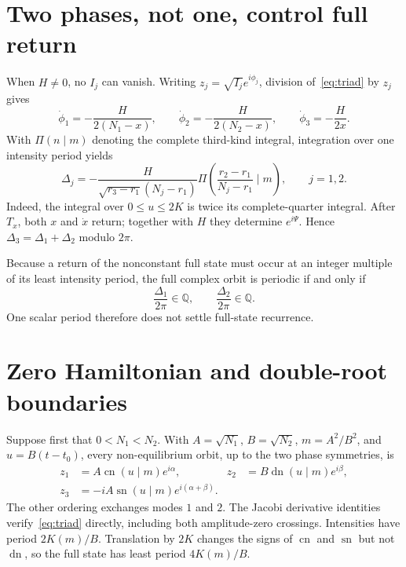 \documentclass[10pt]{article}
\newcommand{\sn}{\operatorname{sn}}
\newcommand{\cn}{\operatorname{cn}}
\newcommand{\dn}{\operatorname{dn}}
\newcommand{\PiK}{\Pi}
\begin{document}
\section{Two phases, not one, control full return}
When $H\ne0$, no $I_j$ can vanish.  Writing
$z_j=\sqrt{I_j}e^{i\phi_j}$, division of~\eqref{eq:triad} by $z_j$ gives
\begin{equation}\label{eq:phasedot}
 \dot\phi_1=-\frac{H}{2(N_1-x)},\qquad
 \dot\phi_2=-\frac{H}{2(N_2-x)},\qquad
 \dot\phi_3=-\frac{H}{2x}.
\end{equation}
With $\PiK(n\mid m)$ denoting the complete third-kind integral, integration
over one intensity period yields
\begin{equation}\label{eq:deltas}
 \Delta_j=-\frac{H}{\sqrt{r_3-r_1}(N_j-r_1)}
 \PiK\left(\frac{r_2-r_1}{N_j-r_1}\mathrel|m\right),
 \qquad j=1,2.
\end{equation}
Indeed, the integral over $0\le u\le2K$ is twice its complete-quarter
integral.  After $T_x$, both $x$ and $\dot x$ return; together with $H$
they determine $e^{i\Psi}$.  Hence
$\Delta_3=\Delta_1+\Delta_2$ modulo $2\pi$.

Because a return of the nonconstant full state must occur at an integer
multiple of its least intensity period, the full complex orbit is periodic
if and only if
\begin{equation}\label{eq:closure}
 \frac{\Delta_1}{2\pi}\in\mathbb Q,\qquad
 \frac{\Delta_2}{2\pi}\in\mathbb Q.
\end{equation}
One scalar period therefore does not settle full-state recurrence.

\section{Zero Hamiltonian and double-root boundaries}
Suppose first that $0<N_1<N_2$.  With $A=\sqrt{N_1}$,
$B=\sqrt{N_2}$, $m=A^2/B^2$, and $u=B(t-t_0)$, every non-equilibrium
orbit, up to the two phase symmetries, is
\begin{equation}\label{eq:Hzero}
 \begin{aligned}
 z_1&=A\cn(u\mid m)e^{i\alpha},&
 z_2&=B\dn(u\mid m)e^{i\beta},\\
 z_3&=-iA\sn(u\mid m)e^{i(\alpha+\beta)}.
 \end{aligned}
\end{equation}
The other ordering exchanges modes $1$ and $2$.  The Jacobi derivative
identities verify~\eqref{eq:triad} directly, including both amplitude-zero
crossings.  Intensities have period $2K(m)/B$.  Translation by $2K$
changes the signs of $\cn$ and $\sn$ but not $\dn$, so the full state has
least period $4K(m)/B$.
\end{document}
